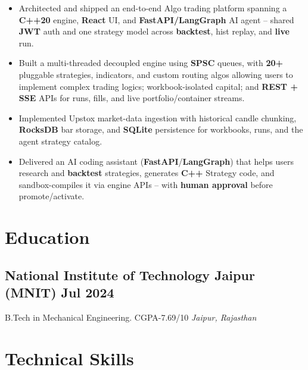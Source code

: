 \documentclass[a4paper,10pt]{article}
\newcommand{\subtext}[1]{
#1\par\vspace{-0.2cm}}
\newenvironment{zitemize}{
\begin{itemize}\itemsep0pt \parskip0pt \parsep1pt}
{\end{itemize}\vspace{-0.7cm}}
\newcommand{\hskills}[1]{
\textbf{\bfseries #1} }
\begin{document}
\begin{zitemize}
\item Architected and shipped an end-to-end Algo trading platform spanning a \textbf{C++20} engine, \textbf{React} UI, and \textbf{FastAPI/LangGraph} AI agent -- shared \textbf{JWT} auth and one strategy model across \textbf{backtest}, hist replay, and \textbf{live} run.
\item Built a multi-threaded decoupled engine using \textbf{SPSC} queues, with \textbf{20+} pluggable strategies, indicators, and custom routing algos allowing users to implement complex trading logics; workbook-isolated capital; and \textbf{REST + SSE} APIs for runs, fills, and live portfolio/container streams.
\item Implemented Upstox market-data ingestion with historical candle chunking, \textbf{RocksDB} bar storage, and \textbf{SQLite} persistence for workbooks, runs, and the agent strategy catalog.
\item Delivered an AI coding assistant (\textbf{FastAPI}/\textbf{LangGraph}) that helps users research and \textbf{backtest} strategies, generates \textbf{C++} Strategy code, and sandbox-compiles it via engine APIs -- with \textbf{human approval} before promote/activate.
\end{zitemize}
\vspace{0.0cm}

\section{Education}
\subsection*{National Institute of Technology Jaipur (MNIT) \hfill Jul 2024} 
\subtext{B.Tech in Mechanical Engineering.  CGPA-7.69/10 \hfill \textit{Jaipur, Rajasthan}}
\vspace{-0.1cm}


\section{Technical Skills}
\vspace{-0.1cm}


\end{document}
